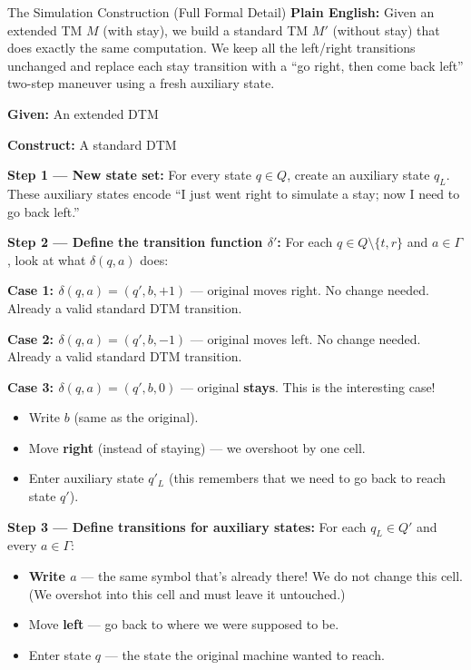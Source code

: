 \begin{definitionbox}{{The Simulation Construction (Full Formal Detail) \kemark}}
\textbf{Plain English:} Given an extended TM $M$ (with stay), we build a standard TM $M'$ (without stay) that does exactly the same computation. We keep all the left/right transitions unchanged and replace each stay transition with a ``go right, then come back left'' two-step maneuver using a fresh auxiliary state.

\textbf{Given:} An extended DTM

\textbf{Construct:} A standard DTM

\textbf{Step 1 --- New state set:} For every state $q \in Q$, create an auxiliary state $q_L$. These auxiliary states encode ``I just went right to simulate a stay; now I need to go back left.''

\textbf{Step 2 --- Define the transition function $\delta'$:} For each $q \in Q \setminus \{t,r\}$ and $a \in \Gamma$, look at what $\delta(q, a)$ does:

\textbf{Case 1: $\delta(q, a) = (q', b, +1)$} --- original moves right.
No change needed. Already a valid standard DTM transition.

\textbf{Case 2: $\delta(q, a) = (q', b, -1)$} --- original moves left.
No change needed. Already a valid standard DTM transition.

\textbf{Case 3: $\delta(q, a) = (q', b, 0)$} --- original \textbf{stays}. This is the interesting case!
\begin{itemize}[nosep]
\item Write $b$ (same as the original).
\item Move \textbf{right} (instead of staying) --- we overshoot by one cell.
\item Enter auxiliary state $q'_L$ (this remembers that we need to go back to reach state $q'$).
\end{itemize}

\textbf{Step 3 --- Define transitions for auxiliary states:} For each $q_L \in Q'$ and every $a \in \Gamma$:
\begin{itemize}[nosep]
\item \textbf{Write $a$} --- the same symbol that's already there! We do not change this cell. (We overshot into this cell and must leave it untouched.)
\item Move \textbf{left} --- go back to where we were supposed to be.
\item Enter state $q$ --- the state the original machine wanted to reach.
\end{itemize}


\end{definitionbox}
